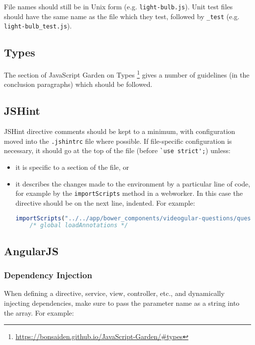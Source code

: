 File names should still be in Unix form (e.g. \texttt{light-bulb.js}).
Unit test files should have the same name as the file which they test,
followed by \texttt{\_test} (e.g. \texttt{light-bulb\_test.js}).

\subsection{Types}

The section of JavaScript Garden on Types
\footnote{\url{https://bonsaiden.github.io/JavaScript-Garden/\#types}}
gives a number of guidelines (in the conclusion paragraphs) which should
be followed.

\subsection{JSHint}

JSHint directive comments should be kept to a minimum, with
configuration moved into the \texttt{.jshintrc} file where possible. If
file-specific configuration is necessary, it should go at the top of the
file (before \lstinline|`use strict';|) unless:

\begin{itemize}
\item
  it is specific to a section of the file, or
\item
  it describes the changes made to the environment by a particular line
  of code, for example by the \texttt{importScripts} method in a \gls{webworker}. In this case the directive should be on the next line,
  indented. For example:

\begin{lstlisting}[language=javascript]
importScripts("../../app/bower_components/videogular-questions/questions-worker.js");
    /* global loadAnnotations */
\end{lstlisting}
\end{itemize}

\subsection{AngularJS}

\subsubsection{Dependency Injection}

When defining a directive, service, view, controller, etc., and
dynamically injecting dependencies, make sure to pass the parameter name
as a string into the array. For example:

